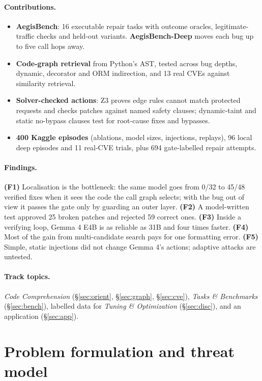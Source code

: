 \documentclass[10pt,a4paper]{article}
\begin{document}
\paragraph{Contributions.}
\begin{itemize}
\item \textbf{AegisBench}: 16 executable repair tasks with outcome oracles, legitimate-traffic checks and held-out variants. \textbf{AegisBench-Deep} moves each bug up to five call hops away.
\item \textbf{Code-graph retrieval} from Python's AST, tested across bug depths, dynamic, decorator and ORM indirection, and 13 real CVEs against similarity retrieval.
\item \textbf{Solver-checked actions}: Z3 proves edge rules cannot match protected requests and checks patches against named safety clauses; dynamic-taint and static no-bypass clauses test for root-cause fixes and bypasses.
\item \textbf{400 Kaggle episodes} (ablations, model sizes, injections, replays), 96 local deep episodes and 11 real-CVE trials, plus 694 gate-labelled repair attempts.
\end{itemize}

\paragraph{Findings.}
\textbf{(F1)} Localisation is the bottleneck: the same model goes from 0/32 to 45/48 verified fixes when it sees the code the call graph selects; with the bug out of view it passes the gate only by guarding an outer layer. \textbf{(F2)} A model-written test approved 25 broken patches and rejected 59 correct ones. \textbf{(F3)} Inside a verifying loop, Gemma 4 E4B is as reliable as 31B and four times faster. \textbf{(F4)} Most of the gain from multi-candidate search pays for one formatting error. \textbf{(F5)} Simple, static injections did not change Gemma 4's actions; adaptive attacks are untested.

\paragraph{Track topics.} \emph{Code Comprehension} (\S\ref{sec:orient}, \S\ref{sec:graph}, \S\ref{sec:cve}), \emph{Tasks \& Benchmarks} (\S\ref{sec:bench}), labelled data for \emph{Tuning \& Optimization} (\S\ref{sec:disc}), and an application (\S\ref{sec:app}).

\section{Problem formulation and threat model}
\end{document}
